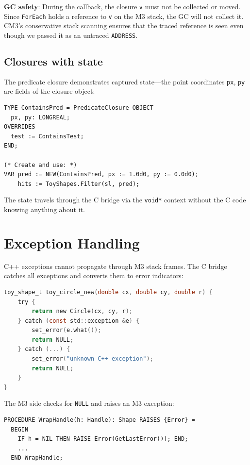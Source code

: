 \documentclass[11pt]{article}
\begin{document}
\textbf{GC safety}: During the callback, the closure \texttt{v} must
not be collected or moved.  Since \texttt{ForEach} holds a reference
to \texttt{v} on the M3 stack, the GC will not collect it.  CM3's
conservative stack scanning ensures that the traced reference is
seen even though we passed it as an untraced \texttt{ADDRESS}.

\subsection{Closures with state}

The predicate closure demonstrates captured state---the point
coordinates \texttt{px}, \texttt{py} are fields of the closure
object:

\begin{lstlisting}
TYPE ContainsPred = PredicateClosure OBJECT
  px, py: LONGREAL;
OVERRIDES
  test := ContainsTest;
END;

(* Create and use: *)
VAR pred := NEW(ContainsPred, px := 1.0d0, py := 0.0d0);
    hits := ToyShapes.Filter(sl, pred);
\end{lstlisting}

The state travels through the C bridge via the \texttt{void*}
context without the C code knowing anything about it.

\section{Exception Handling}

C++ exceptions cannot propagate through M3 stack frames.  The C
bridge catches all exceptions and converts them to error indicators:

\begin{lstlisting}[language=C]
toy_shape_t toy_circle_new(double cx, double cy, double r) {
    try {
        return new Circle(cx, cy, r);
    } catch (const std::exception &e) {
        set_error(e.what());
        return NULL;
    } catch (...) {
        set_error("unknown C++ exception");
        return NULL;
    }
}
\end{lstlisting}

The M3 side checks for \texttt{NULL} and raises an M3 exception:

\begin{lstlisting}
PROCEDURE WrapHandle(h: Handle): Shape RAISES {Error} =
  BEGIN
    IF h = NIL THEN RAISE Error(GetLastError()); END;
    ...
  END WrapHandle;
\end{lstlisting}
\end{document}
